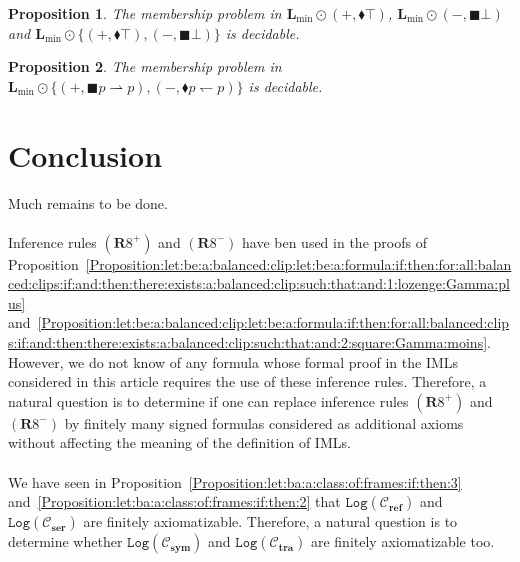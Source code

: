 \documentclass[draft]{article}
\newtheorem{proposition}{Proposition}
\def\Rule{\mathbf{R}}
\def\sym{\mathbf{sym}}
\def\reflexive{\mathbf{ref}}
\def\transitive{\mathbf{tra}}
\def\serial{\mathbf{ser}}
\def\Log{\mathtt{Log}}
\def\L{\mathbf{L}}
\begin{document}
%
%
\begin{proposition}\label{proposition:two:variable:guarded:fragment:is:decidable:ser}
%
%
The membership problem in $\L_{\min}{\odot}(+,{\blacklozenge}{\top})$, $\L_{\min}{\odot}(-,{\blacksquare}{\bot})$ and
%
%
%
%
%
%
%
\linebreak$
%
%
%
%
%
%
\L_{\min}{\odot}\{(+,{\blacklozenge}{\top}),(-,{\blacksquare}{\bot})\}$ is decidable.
%
%
\end{proposition}
%
%
\begin{proposition}\label{proposition:two:variable:guarded:fragment:is:decidable:ref}
%
%
The membership problem in $\L_{\min}{\odot}\{(+,{\blacksquare}p{\rightharpoonup}p),(-,{\blacklozenge}p{\leftharpoondown}p)\}$ is decidable.
%
%
\end{proposition}
%
%
%
%
\section{Conclusion}\label{section:conclusion}
%
%
Much remains to be done.
%
%
\\
\\
%
%
Inference rules $(\Rule8^{+})$ and $(\Rule8^{-})$ have ben used in the proofs of Proposition~\ref{Proposition:let:be:a:balanced:clip:let:be:a:formula:if:then:for:all:balanced:clips:if:and:then:there:exists:a:balanced:clip:such:that:and:1:lozenge:Gamma:plus} and~\ref{Proposition:let:be:a:balanced:clip:let:be:a:formula:if:then:for:all:balanced:clips:if:and:then:there:exists:a:balanced:clip:such:that:and:2:square:Gamma:moins}.
However, we do not know of any formula whose formal proof in the IMLs considered in this article requires the use of these inference rules.
Therefore, a natural question is to determine if one can replace inference rules $(\Rule8^{+})$ and $(\Rule8^{-})$ by finitely many signed formulas considered as additional axioms without affecting the meaning of the definition of IMLs.
%
%
\\
\\
%
%
We have seen in Proposition~\ref{Proposition:let:ba:a:class:of:frames:if:then:3} and~\ref{Proposition:let:ba:a:class:of:frames:if:then:2} that $\Log({\mathcal C}_{\reflexive})$ and $\Log({\mathcal C}_{\serial})$ are finitely axiomatizable.
Therefore, a natural question is to determine whether $\Log({\mathcal C}_{\sym})$ and $\Log({\mathcal C}_{\transitive})$ are finitely axiomatizable too.
\end{document}
